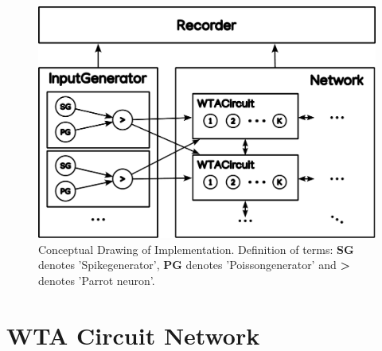 \begin{figure}[htbp]
    \centering
    \includegraphics[width=\columnwidth]{Figures/implementation_conceptual.pdf}
    \caption{Conceptual Drawing of Implementation. Definition of terms: \textbf{SG} denotes 'Spikegenerator', \textbf{PG} denotes 'Poissongenerator' and \textbf{>} denotes 'Parrot neuron'.}
    \label{fig:implementation_concept_drawing}
\end{figure}

\section{WTA Circuit Network} \label{sec:wta_circuit_network}
